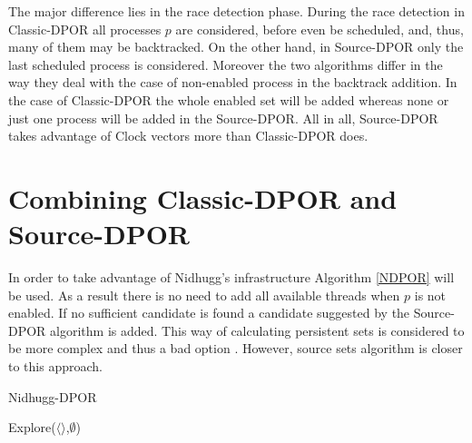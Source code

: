 The major difference lies in the race detection phase. During the race detection in Classic-DPOR all processes $p$ are considered, before even be scheduled, and, thus, many of them
may be backtracked. On the other hand, in Source-DPOR only the last scheduled process is considered. Moreover the two algorithms differ in the way they deal with
the case of non-enabled process in the backtrack addition. In the case of Classic-DPOR the whole enabled set will be added whereas none or just one process will
be added in the Source-DPOR. All in all, Source-DPOR takes advantage of Clock vectors more than Classic-DPOR does.

\section{Combining Classic-DPOR and Source-DPOR}

In order to take advantage of Nidhugg's infrastructure Algorithm \ref{NDPOR} will be used. As a result there is no need to add all
available threads when $p$ is not enabled. If no sufficient candidate is found
a candidate suggested by the Source-DPOR algorithm is added. This way of calculating persistent sets is considered to be more 
complex and thus a bad option \cite{Gode05}. However, source sets algorithm is closer to this approach.

\begin{algorithm}
    \caption{Nidhugg-DPOR}
    \label{NDPOR}
    Explore($\langle \rangle$,$\emptyset$)\;
\end{algorithm}

